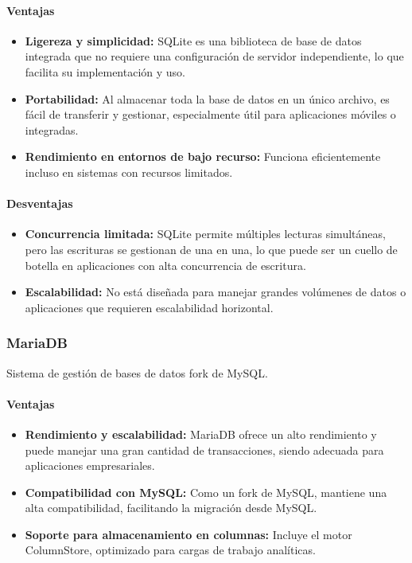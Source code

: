 \paragraph{Ventajas}
\begin{itemize}
    \item \textbf{Ligereza y simplicidad:} SQLite es una biblioteca de base de datos integrada que no requiere una configuración de servidor independiente, lo que facilita su implementación y uso.
    
    \item \textbf{Portabilidad:} Al almacenar toda la base de datos en un único archivo, es fácil de transferir y gestionar, especialmente útil para aplicaciones móviles o integradas.
    
    \item \textbf{Rendimiento en entornos de bajo recurso:} Funciona eficientemente incluso en sistemas con recursos limitados.
\end{itemize}

\paragraph{Desventajas}
\begin{itemize}
    \item \textbf{Concurrencia limitada:} SQLite permite múltiples lecturas simultáneas, pero las escrituras se gestionan de una en una, lo que puede ser un cuello de botella en aplicaciones con alta concurrencia de escritura.
    
    \item \textbf{Escalabilidad:} No está diseñada para manejar grandes volúmenes de datos o aplicaciones que requieren escalabilidad horizontal.
\end{itemize}

\subsubsection{MariaDB}
Sistema de gestión de bases de datos fork de MySQL.

\paragraph{Ventajas}
\begin{itemize}
    \item \textbf{Rendimiento y escalabilidad:} MariaDB ofrece un alto rendimiento y puede manejar una gran cantidad de transacciones, siendo adecuada para aplicaciones empresariales.
    
    \item \textbf{Compatibilidad con MySQL:} Como un fork de MySQL, mantiene una alta compatibilidad, facilitando la migración desde MySQL.
    
    \item \textbf{Soporte para almacenamiento en columnas:} Incluye el motor ColumnStore, optimizado para cargas de trabajo analíticas.
\end{itemize}

